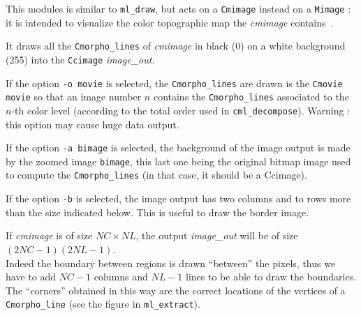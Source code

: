 This modules is similar to {\tt ml\_draw}, but acts on a {\tt Cmimage} instead
on a {\tt Mimage} : it is intended to visualize the color topographic 
map the {\em cmimage} 
contains~\cite{coll.froment:topographic}.

It draws all the {\tt Cmorpho\_lines} of {\em cmimage} in
black (0) on a white background (255) into  the
{\tt Ccimage} {\em image\_out}.

If the option \verb+-o movie+ is selected, the {\tt Cmorpho\_lines}
are drawn is the {\tt Cmovie} \verb+movie+ so that an image number
$n$ contains the {\tt Cmorpho\_lines} associated to the $n$-th 
color level (according to the total order used in {\tt cml\_decompose}). 
Warning : this option may cause huge data output.

If the option \verb+-a bimage+ is selected, the background of the
image output is made by the zoomed image \verb+bimage+, this last
one being the original bitmap image used to compute the {\tt Cmorpho\_lines}
(in that case, it should be a Ccimage).

If the option \verb+-b+ is selected, the image output has two columns
and to rows more than the size indicated below. This is useful to
draw the border image. 

\smallskip

If {\em cmimage} is of size $NC\times NL$, 
the output {\em image\_out} will be of size $(2NC-1)(2NL-1)$.\\
Indeed the boundary between regions is drawn ``between'' the pixels,
thus we have to add $NC-1$ columns and $NL-1$ lines to be able
to draw the boundaries. \\
The ``corners'' obtained in this way are the correct locations
of the vertices of a {\tt Cmorpho\_line} (see the figure in
{\tt ml\_extract}).
